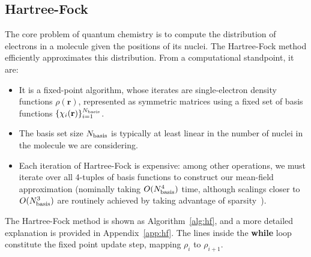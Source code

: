 \documentclass[twoside,11pt]{article}
\begin{document}
\subsection{Hartree-Fock}
The core problem of quantum chemistry is to compute the distribution of electrons in a molecule given the positions of its nuclei.  The Hartree-Fock method efficiently approximates this distribution.  From a computational standpoint, it are:
\begin{itemize}
\item It is a fixed-point algorithm, whose iterates are single-electron density functions $\rho(\mathbf r)$, represented as symmetric matrices using a fixed set of basis functions $\{\chi_i(\mathbf r)\}_{i=1}^{N_{\rm basis}}$.
\item The basis set size $N_{\rm basis}$ is typically at least linear in the number of nuclei in the molecule we are considering.
\item Each iteration of Hartree-Fock is expensive: among other operations, we must iterate over all 4-tuples of basis functions to construct our mean-field approximation (nominally taking $O(N_{\rm basis}^4)$ time, although scalings closer to $O(N_{\rm basis}^3)$ are routinely achieved by taking advantage of sparsity~\citep{cook}).
\end{itemize}
The Hartree-Fock method is shown as Algorithm~\ref{alg:hf}, and a more detailed explanation is provided in Appendix~\ref{app:hf}.  The lines inside the \textbf{while} loop constitute the fixed point update step, mapping $\rho_i$ to $\rho_{i+1}$.
\end{document}
